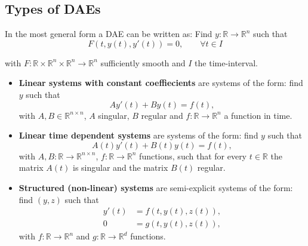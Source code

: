 	\subsection{Types of DAEs}
	\begin{frame}
		In the most general form a DAE can be written as:
		Find $y:\mathbb{R} \to \mathbb{R}^n$ such that
		\begin{equation}
			\label{Abstract_DAE}
			F(t, y(t), y'(t)) = 0, \qquad \forall t \in I
		\end{equation}
		
		with $F:\mathbb{R} \times \mathbb{R}^n \times \mathbb{R}^n \to \mathbb{R}^n$ sufficiently smooth and $I$ the time-interval.
	\end{frame}
	\begin{frame}
		\begin{itemize}
			\item \textbf{Linear systems with constant coeffiecients} \newline
			are systems of the form: find $y$ such that
			\begin{equation}
				\label{DAE-const-coeff}
				A y'(t) + B y(t) = f(t) ,
			\end{equation}
			with $A,B \in \mathbb{R}^{n \times n}$, $A$ singular, $B$ regular and $f:\mathbb{R} \to \mathbb{R}^n$ a function in time.
			
			\item \textbf{Linear time dependent systems}
			are systems of the form: find $y$ such that
			\begin{displaymath}
				A(t) y'(t) + B(t) y(t) = f(t) ,
			\end{displaymath}
			with $A, B:\mathbb{R} \to \mathbb{R}^{n \times n}$, $f:\mathbb{R} \to \mathbb{R}^n$ functions, such that for every $t \in \mathbb{R}$ the matrix $A(t)$ is singular and the matrix $B(t)$ regular.
			
			\item  \textbf{Structured (non-linear) systems} \newline
			are semi-explicit systems of the form: find $(y,z)$ such that
			\begin{align}
				y'(t) &= f(t, y(t), z(t)) , \\
				0 &= g(t,y(t),z(t)) ,
			\end{align}
			with $f:\mathbb{R} \to \mathbb{R}^n$ and $g:\mathbb{R} \to \mathbb{R}^d$ functions.
		\end{itemize}
	\end{frame}

